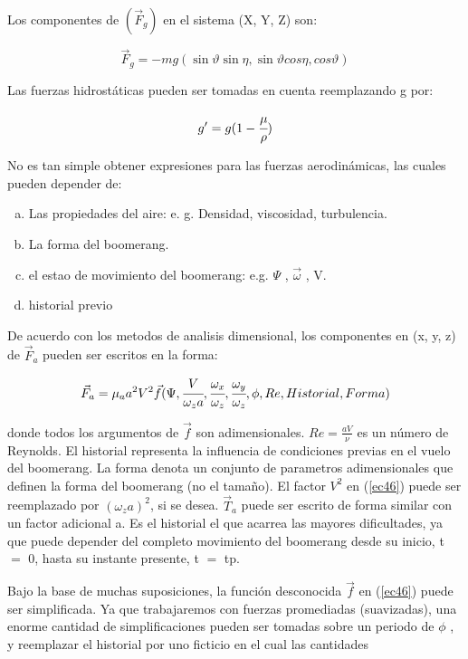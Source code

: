 	Los componentes de $({\vec{F}}_{g})$ en el sistema (X, Y, Z) son:

		\begin{equation}
    	{\vec{F}}_{g}=-mg(\sin{\vartheta}\sin{\eta},\sin{\vartheta}cos{\eta},cos{\vartheta})
		\label{ec44}
		\end{equation}

	Las fuerzas hidrostáticas pueden ser tomadas en cuenta reemplazando g por:

		\begin{equation}
		{g}^{\prime}=g(1-\cfrac{{\mu}}{\rho})
		\label{ec45}
		\end{equation}

	No es tan simple obtener expresiones para las fuerzas aerodinámicas, las cuales pueden depender de:

		\begin{enumerate}[a)]
		\item Las propiedades del aire: e. g. Densidad, viscosidad, turbulencia.
		\item La forma del boomerang.
		\item el estao de movimiento del boomerang: e.g.  $\Psi$ , $\vec{\omega}$ , V.
		\item historial previo
		\end{enumerate}

	De acuerdo con los metodos de analisis dimensional, los componentes en (x, y, z) de ${\vec{F}}_{a}$ pueden ser escritos en la forma:

		\begin{equation}
		\vec{F}_{a}={\mu}_{a}{a}^{2}{V}^{2}\vec{f}(\Psi,\cfrac{V}{{\omega}_{z}a},\cfrac{{\omega}_{x}}{{\omega}_{z}},\cfrac{{\omega}_{y}}{{\omega}_{z}},\phi,Re,Historial,Forma)
		\label{ec46}
		\end{equation}

	donde todos los argumentos de  $\vec{f}$ son adimensionales. $Re=\frac{aV}{\nu}$ es un número de Reynolds. El historial representa la influencia de condiciones previas en el vuelo del boomerang. La forma denota un conjunto de parametros adimensionales que definen la forma del boomerang (no el tamaño). El factor ${V}^{2}$ en (\ref{ec46}) puede ser reemplazado por $({\omega}_{z}a)^{2}$, si se desea. ${\vec{T}}_{a}$ puede ser escrito de forma similar con un factor adicional a. Es el historial el que acarrea las mayores dificultades, ya que puede depender del completo movimiento del boomerang desde su inicio, t $=$ 0, hasta su instante presente, t $=$ tp.

	Bajo la base de muchas suposiciones, la función desconocida $\vec{f}$ en (\ref{ec46}) puede ser simplificada. Ya que trabajaremos con fuerzas promediadas (suavizadas), una enorme cantidad de simplificaciones pueden ser tomadas sobre un periodo de $\phi$ , y reemplazar el historial por uno ficticio en el cual las cantidades

